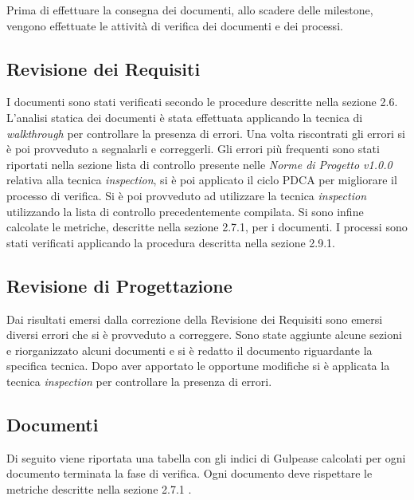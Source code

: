 Prima di effettuare la consegna dei documenti, allo scadere delle \gls{milestone}, vengono effettuate le attività di verifica dei documenti e dei processi.

\subsection{Revisione dei Requisiti}

\noindent I documenti sono stati verificati secondo le procedure descritte nella sezione 2.6.
L'analisi statica dei documenti è stata effettuata applicando la tecnica di \textit{\gls{walkthrough}} per controllare la presenza di errori. Una volta riscontrati gli errori si è poi provveduto a segnalarli e correggerli. Gli errori più frequenti sono stati riportati nella sezione lista di controllo presente nelle \textit{Norme di Progetto v1.0.0} relativa alla tecnica \textit{\gls{inspection}}, si è poi applicato il ciclo \gls{PDCA} per migliorare il processo di verifica. Si è poi provveduto ad utilizzare la tecnica \textit{\gls{inspection}} utilizzando la lista di controllo precedentemente compilata. Si sono infine calcolate le metriche, descritte nella sezione 2.7.1, per i documenti. I processi sono stati verificati applicando la procedura descritta nella sezione 2.9.1.

\subsection{Revisione di Progettazione}

Dai risultati emersi dalla correzione della Revisione dei Requisiti sono emersi diversi errori che si è provveduto a correggere.
Sono state aggiunte alcune sezioni e riorganizzato alcuni documenti e si è redatto il documento riguardante la specifica tecnica.
Dopo aver apportato le opportune modifiche si è applicata la tecnica \textit{\gls{inspection}} per controllare la presenza di errori.

\subsection{Documenti}

Di seguito viene riportata una tabella con gli indici di \gls{Gulpease} calcolati per ogni documento terminata la fase di verifica. Ogni documento deve rispettare le metriche descritte nella sezione 2.7.1 .\\

\hspace{1cm}

